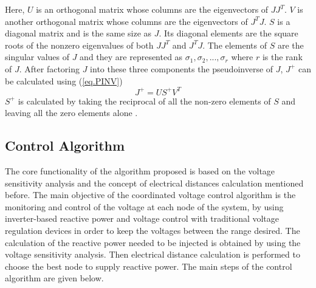 Here, $U$ is an orthogonal matrix whose columns are the eigenvectors of $JJ^T$. $V$ is another orthogonal matrix whose columns are the eigenvectors of $J^{T}J$. $S$ is a diagonal matrix and is the same size as $J$. Its diagonal elements are the square roots of the nonzero eigenvalues of both $JJ^T$ and $J^{T}J$. The elements of $S$ are the singular values of $J$ and they are represented as $\sigma_1, \sigma_2, ..., \sigma_r$ where $r$ is the rank of $J$. After factoring $J$ into these three components the pseudoinverse of $J$, $J^+$ can be calculated using (\ref{eq.PINV}) \cite{PINV}
\begin{equation}\label{eq.PINV}
    J^+ = US^{+}V^T
\end{equation}
$S^+$ is calculated by taking the reciprocal of all the non-zero elements of $S$ and leaving all the zero elements alone \cite{PINV}.  


\subsection{Control Algorithm}
The core functionality of the algorithm proposed is based on the voltage sensitivity analysis and the concept of electrical distances calculation mentioned before. The main objective of the coordinated voltage control algorithm is the monitoring and control of the voltage at each node of the system, by using inverter-based reactive power and voltage control with traditional voltage regulation devices in order to keep the voltages between the range desired. The calculation of the reactive power needed to be injected is obtained by using the voltage sensitivity analysis. Then electrical distance calculation is performed to choose the best node to supply reactive power. The main steps of the control algorithm are given below.

